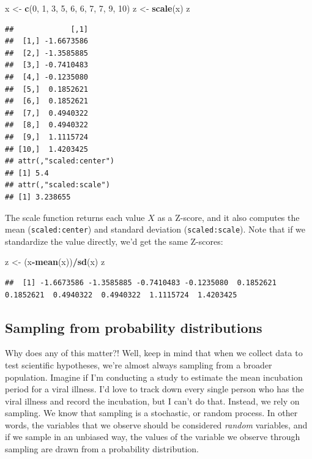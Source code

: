 \documentclass[
]{book}
\newenvironment{Shaded}{\begin{snugshade}}{\end{snugshade}}
\newcommand{\DecValTok}[1]{\textcolor[rgb]{0.00,0.00,0.81}{#1}}
\newcommand{\FunctionTok}[1]{\textcolor[rgb]{0.13,0.29,0.53}{\textbf{#1}}}
\newcommand{\NormalTok}[1]{#1}
\newcommand{\OtherTok}[1]{\textcolor[rgb]{0.56,0.35,0.01}{#1}}
\newcommand{\SpecialCharTok}[1]{\textcolor[rgb]{0.81,0.36,0.00}{\textbf{#1}}}
\begin{document}
\begin{Shaded}
\begin{Highlighting}[]
\NormalTok{x }\OtherTok{\textless{}{-}} \FunctionTok{c}\NormalTok{(}\DecValTok{0}\NormalTok{, }\DecValTok{1}\NormalTok{, }\DecValTok{3}\NormalTok{, }\DecValTok{5}\NormalTok{, }\DecValTok{6}\NormalTok{, }\DecValTok{6}\NormalTok{, }\DecValTok{7}\NormalTok{, }\DecValTok{7}\NormalTok{, }\DecValTok{9}\NormalTok{, }\DecValTok{10}\NormalTok{)}
\NormalTok{z }\OtherTok{\textless{}{-}} \FunctionTok{scale}\NormalTok{(x)}
\NormalTok{z}
\end{Highlighting}
\end{Shaded}

\begin{verbatim}
##             [,1]
##  [1,] -1.6673586
##  [2,] -1.3585885
##  [3,] -0.7410483
##  [4,] -0.1235080
##  [5,]  0.1852621
##  [6,]  0.1852621
##  [7,]  0.4940322
##  [8,]  0.4940322
##  [9,]  1.1115724
## [10,]  1.4203425
## attr(,"scaled:center")
## [1] 5.4
## attr(,"scaled:scale")
## [1] 3.238655
\end{verbatim}

The scale function returns each value \(X\) as a Z-score, and it also computes the mean (\texttt{scaled:center}) and standard deviation (\texttt{scaled:scale}). Note that if we standardize the value directly, we'd get the same Z-scores:

\begin{Shaded}
\begin{Highlighting}[]
\NormalTok{z }\OtherTok{\textless{}{-}}\NormalTok{ (x}\SpecialCharTok{{-}}\FunctionTok{mean}\NormalTok{(x))}\SpecialCharTok{/}\FunctionTok{sd}\NormalTok{(x)}
\NormalTok{z}
\end{Highlighting}
\end{Shaded}

\begin{verbatim}
##  [1] -1.6673586 -1.3585885 -0.7410483 -0.1235080  0.1852621  0.1852621  0.4940322  0.4940322  1.1115724  1.4203425
\end{verbatim}

\subsection{Sampling from probability distributions}\label{sampling-from-probability-distributions}

Why does any of this matter?! Well, keep in mind that when we collect data to test scientific hypotheses, we're almost always sampling from a broader population. Imagine if I'm conducting a study to estimate the mean incubation period for a viral illness. I'd love to track down every single person who has the viral illness and record the incubation, but I can't do that. Instead, we rely on sampling. We know that sampling is a stochastic, or random process. In other words, the variables that we observe should be considered \emph{random} variables, and if we sample in an unbiased way, the values of the variable we observe through sampling are drawn from a probability distribution.
\end{document}
